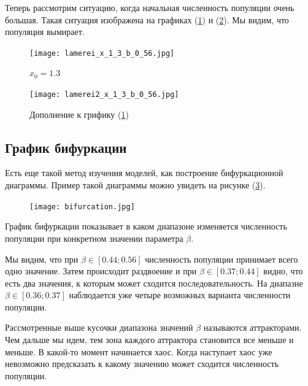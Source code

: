         Теперь рассмотрим ситуацию, когда начальная численность популяции очень большая. Такая ситуация изображена на графиках (\ref{lamerei_x_1_3_b_0_56}) и (\ref{lamerei2_x_1_3_b_0_56}). Мы видим, что популяция вымирает.
            
        \begin{figure}
            \centering
            \texttt{[image: lamerei\_x\_1\_3\_b\_0\_56.jpg]}
    
            \captionsetup{justification=centering}
            \caption{\(x_0 = 1.3\)}
            \label{lamerei_x_1_3_b_0_56}
        \end{figure}
            
        \begin{figure}
            \centering
            \texttt{[image: lamerei2\_x\_1\_3\_b\_0\_56.jpg]}
    
            \captionsetup{justification=centering}
            \caption{Дополнение к грифику (\ref{lamerei_x_1_3_b_0_56})}
            \label{lamerei2_x_1_3_b_0_56}
        \end{figure}

    \subsection{График бифуркации}

        Есть еще такой метод изучения моделей, как построение бифуркационной диаграммы. Пример такой диаграммы можно увидеть на рисунке (\ref{bifurcation}).

        \begin{figure}
            \centering
            \texttt{[image: bifurcation.jpg]}

            \captionsetup{justification=centering}
            \caption{}
            \label{bifurcation}
        \end{figure}

        График бифуркации показывает в каком диапазоне изменяется численность популяции при конкретном значении параметра \(\beta\).

        Мы видим, что при \(\beta \in [0.44; 0.56]\) численность популяции принимает всего одно значение. Затем происходит раздвоение и при \(\beta \in [0.37; 0.44]\) видно, что есть два значения, к которым может сходится последовательность. На диапазне \(\beta \in [0.36; 0.37]\) наблюдается уже четыре возможных варианта численности популяции. 
        
        Рассмотренные выше кусочки диапазона значений \(\beta\) называются аттракторами. Чем дальше мы идем, тем зона каждого аттрактора становится все меньше и меньше. В какой-то момент начинается хаос. Когда наступает хаос уже невозможно предсказать к какому значению может сходится численность популяции.

